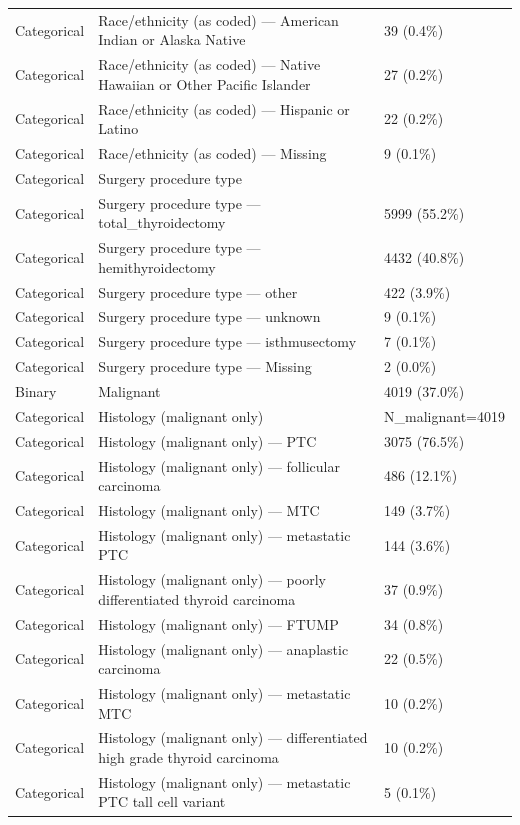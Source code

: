 \begin{table}[htbp]
\begin{tabular}{lll}
Categorical & Race/ethnicity (as coded) — American Indian or Alaska Native & 39 (0.4\%) \\
Categorical & Race/ethnicity (as coded) — Native Hawaiian or Other Pacific Islander & 27 (0.2\%) \\
Categorical & Race/ethnicity (as coded) — Hispanic or Latino & 22 (0.2\%) \\
Categorical & Race/ethnicity (as coded) — Missing & 9 (0.1\%) \\
Categorical & Surgery procedure type &  \\
Categorical & Surgery procedure type — total\_thyroidectomy & 5999 (55.2\%) \\
Categorical & Surgery procedure type — hemithyroidectomy & 4432 (40.8\%) \\
Categorical & Surgery procedure type — other & 422 (3.9\%) \\
Categorical & Surgery procedure type — unknown & 9 (0.1\%) \\
Categorical & Surgery procedure type — isthmusectomy & 7 (0.1\%) \\
Categorical & Surgery procedure type — Missing & 2 (0.0\%) \\
Binary & Malignant & 4019 (37.0\%) \\
Categorical & Histology (malignant only) & N\_malignant=4019 \\
Categorical & Histology (malignant only) — PTC & 3075 (76.5\%) \\
Categorical & Histology (malignant only) — follicular carcinoma & 486 (12.1\%) \\
Categorical & Histology (malignant only) — MTC & 149 (3.7\%) \\
Categorical & Histology (malignant only) — metastatic PTC & 144 (3.6\%) \\
Categorical & Histology (malignant only) — poorly differentiated thyroid carcinoma & 37 (0.9\%) \\
Categorical & Histology (malignant only) — FTUMP & 34 (0.8\%) \\
Categorical & Histology (malignant only) — anaplastic carcinoma & 22 (0.5\%) \\
Categorical & Histology (malignant only) — metastatic MTC & 10 (0.2\%) \\
Categorical & Histology (malignant only) — differentiated high grade thyroid carcinoma & 10 (0.2\%) \\
Categorical & Histology (malignant only) — metastatic PTC tall cell variant & 5 (0.1\%) \\

\end{tabular}
\end{table}
